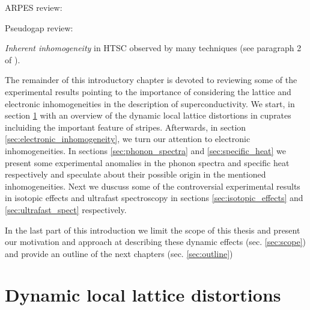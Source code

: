 

ARPES review: \cite{Damascelli2003}

Pseudogap review: \cite{Timusk1999}

\textit{Inherent inhomogeneity} in HTSC observed by many techniques (see paragraph 2 of \cite{Bussmann-Holder2005}).

The remainder of this introductory chapter is devoted to reviewing some of the experimental results pointing to the importance of considering the lattice and electronic inhomogeneities in the description of superconductivity. 
We start, in section \ref{sec:dynamic_dist} with an overview of the dynamic local lattice distortions in cuprates incluiding the important feature of stripes. 
Afterwards, in section \ref{sec:electronic_inhomogeneity}, we turn our attention to electronic inhomogeneities. 
In sections \ref{sec:phonon_spectra} and \ref{sec:specific_heat} we present some experimental anomalies in the phonon spectra and specific heat respectively and speculate about their possible origin in the mentioned inhomogeneities. 
Next we duscuss some of the controversial experimental results in isotopic effects and ultrafast spectroscopy in sections \ref{sec:isotopic_effects} and \ref{sec:ultrafast_spect} respectively.

In the last part of this introduction we limit the scope of this thesis and present our motivation and approach at describing these dynamic effects (sec. \ref{sec:scope}) and provide an outline of the next chapters (sec. \ref{sec:outline})

\section{Dynamic local lattice distortions}
\label{sec:dynamic_dist}

